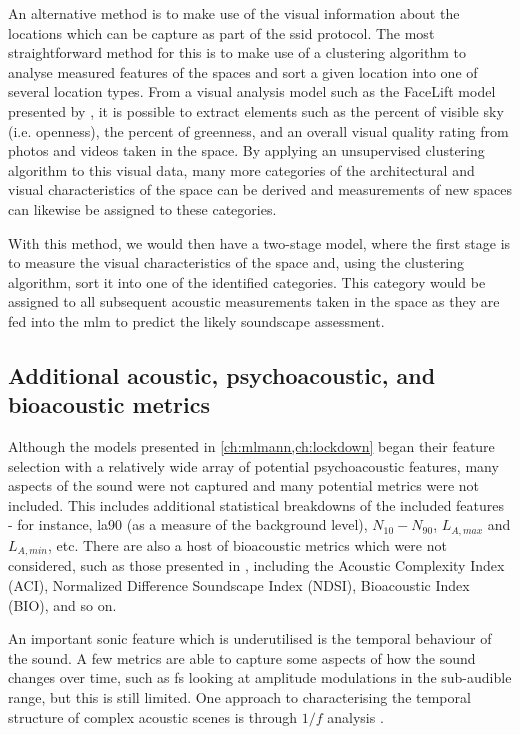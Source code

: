 An alternative method is to make use of the visual information about the locations which can be capture as part of the \gls{ssid} protocol. The most straightforward method for this is to make use of a clustering algorithm to analyse measured features of the spaces and sort a given location into one of several location types. From a visual analysis model such as the FaceLift model presented by \citet{Joglekar2020Facelift}, it is possible to extract elements such as the percent of visible sky (i.e. openness), the percent of greenness, and an overall visual quality rating from photos and videos taken in the space. By applying an unsupervised clustering algorithm to this visual data, many more categories of the architectural and visual characteristics of the space can be derived and measurements of new spaces can likewise be assigned to these categories.  

With this method, we would then have a two-stage model, where the first stage is to measure the visual characteristics of the space and, using the clustering algorithm, sort it into one of the identified categories. This category would be assigned to all subsequent acoustic measurements taken in the space as they are fed into the \gls{mlm} to predict the likely soundscape assessment.

\subsection{Additional acoustic, psychoacoustic, and bioacoustic metrics}

Although the models presented in \cref{ch:mlmann,ch:lockdown} began their feature selection with a relatively wide array of potential psychoacoustic features, many aspects of the sound were not captured and many potential metrics were not included. This includes additional statistical breakdowns of the included features - for instance, \gls{la90} (as a measure of the background level), $N_{10} - N_{90}$, $L_{A,max}$ and $L_{A,min}$, etc. There are also a host of bioacoustic metrics which were not considered, such as those presented in \citet{Devos2016Soundecology}, including the Acoustic Complexity Index (ACI), Normalized Difference Soundscape Index (NDSI), Bioacoustic Index (BIO), and so on. 

An important sonic feature which is underutilised is the temporal behaviour of the sound. A few metrics are able to capture some aspects of how the sound changes over time, such as \gls{fs} looking at amplitude modulations in the sub-audible range, but this is still limited. One approach to characterising the temporal structure of complex acoustic scenes is through $1/f$ analysis \citep{deCoensel20031f,deCoensel2006quiet,Yang2015Presence}. 

